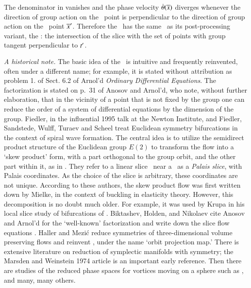 \documentclass[final,number,sort&compress]{elsarticle}
\begin{document}
The denominator in  vanishes and the phase
velocity $\dot{{\bf \theta}}(\overline{x})$ diverges whenever the
direction of group action on the \reducedsp\ point is
perpendicular to the direction of group action on the \slice\
point ${\overline{x}'}$. Therefore the \mslices\ has the same \sset\ as
its post-processing variant, the \mframes: the intersection of
the slice with the set of points with group tangent
perpendicular to $t'_{}$.

\emph{A historical note.}
The basic idea of the \mslices\ is intuitive and
frequently reinvented, often under a different name; for example,
it is stated without attribution as problem 1. of Sect.
6.2 of Arnol'd {\em Ordinary Differential
Equations}. The factorization
 is stated on p.~31 of Anosov and
Arnol'd, who note, without further elaboration,
that in the vicinity of a point that is not fixed by the
group one can reduce the order of a system of differential
equations by the dimension of the group.
Fiedler, in the influential 1995 talk
at the Newton Institute, and Fiedler, Sandstede, Wulff,
Turaev and  Scheel
treat Euclidean symmetry bifurcations in the context of
spiral wave formation. The central idea is to utilize the
semidirect product structure of the Euclidean group $E(2)$ to
transform the flow into a `skew product' form, with a part
orthogonal to the group orbit, and the other part within it,
as in . They refer to a linear slice
\pSRed\ near a \reqv\ as a {\em Palais slice}, with Palais
coordinates. As the choice of the slice is arbitrary, these
coordinates are not unique. According to these authors, the
skew product flow was first written down by
Mielke, in the context of buckling in
elasticity theory. However, this decomposition is no doubt
much older. For example, it was  used by
Krupa in his local slice study of
bifurcations of \reqva. Biktashev, Holden, and
Nikolaev cite Anosov and Arnol'd  for
the `well-known' factorization  and write
down the slice flow equations .
Haller and Mezi\'c reduce symmetries of
three-dimensional volume preserving flows and reinvent
\mframes, under the name `orbit projection map.' There is
extensive literature on reduction of symplectic manifolds
with symmetry; the Marsden and Weinstein 1974 article
is an important early reference. Then there are studies of
the reduced phase spaces for vortices moving on a sphere such
as , and many, many others.
\end{document}
